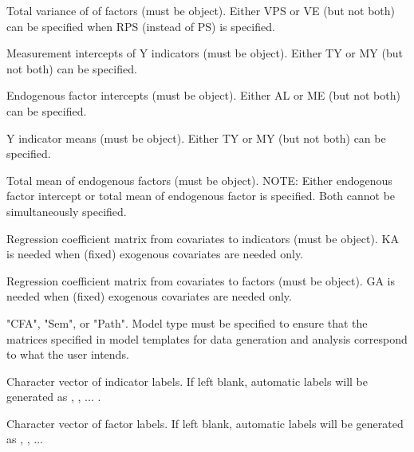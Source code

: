 \documentclass[a4paper]{book}
\begin{document}
\begin{Arguments}
\begin{ldescription}
\item[\code{VE}] 
Total variance of of factors (must be  object). Either VPS or VE (but not both) can be specified when RPS (instead of PS) is specified.
 
\item[\code{TY}] 
Measurement intercepts of Y indicators (must be  object). Either TY or MY (but not both) can be specified. 

\item[\code{AL}] 
Endogenous factor intercepts (must be  object). Either AL or ME (but not both) can be specified. 

\item[\code{MY}] 
Y indicator means (must be  object). Either TY or MY (but not both) can be specified. 

\item[\code{ME}] 
Total mean of endogenous factors (must be  object). NOTE: Either endogenous factor intercept or total mean of endogenous factor is specified. Both cannot be simultaneously specified.

\item[\code{KA}] 
Regression coefficient matrix from covariates to indicators (must be  object). KA is needed when (fixed) exogenous covariates are needed only.

\item[\code{GA}] 
Regression coefficient matrix from covariates to factors (must be  object). GA is needed when (fixed) exogenous covariates are needed only.

\item[\code{modelType}] 
"CFA", "Sem", or "Path". Model type must be specified to ensure that the matrices specified in model templates for data generation and analysis correspond to what the user intends.

\item[\code{indLab}] 
Character vector of indicator labels. If left blank, automatic labels will be generated as  , , ... .

\item[\code{facLab}]  
Character vector of factor labels. If left blank, automatic labels will be generated as , , ... 


\end{ldescription}
\end{Arguments}
\end{document}
